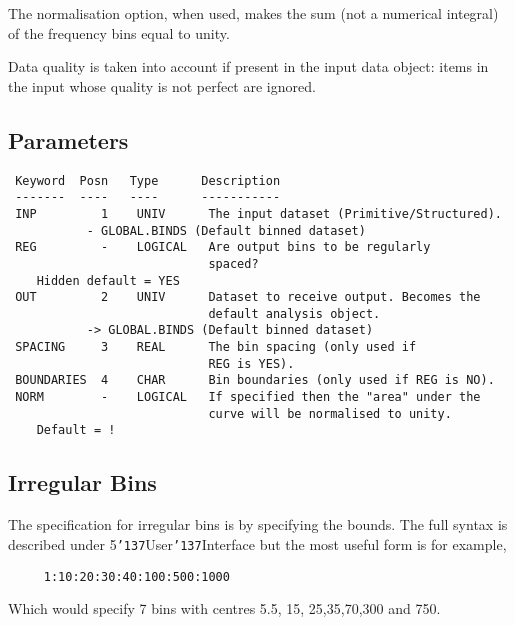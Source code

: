 \documentclass{book}
\renewcommand{\_}{{\tt\char'137}}     %
\begin{document}
The normalisation option, when used, makes the sum (not a
numerical integral) of the frequency bins equal to unity.

Data quality is taken into account if present in the input data
object: items in the input whose quality is not perfect are
ignored.

\subsection{Parameters}
\begin{verbatim}
 Keyword  Posn   Type      Description
 -------  ----   ----      -----------
 INP         1    UNIV      The input dataset (Primitive/Structured).
           - GLOBAL.BINDS (Default binned dataset)
 REG         -    LOGICAL   Are output bins to be regularly
                            spaced?
    Hidden default = YES
 OUT         2    UNIV      Dataset to receive output. Becomes the
                            default analysis object.
           -> GLOBAL.BINDS (Default binned dataset)
 SPACING     3    REAL      The bin spacing (only used if
                            REG is YES).
 BOUNDARIES  4    CHAR      Bin boundaries (only used if REG is NO).
 NORM        -    LOGICAL   If specified then the "area" under the
                            curve will be normalised to unity.
    Default = !

\end{verbatim}\subsection{Irregular Bins}
The specification for irregular bins is by specifying the
bounds. The full syntax is described under 5\_User\_Interface
but the most useful form is for example,
\begin{verbatim}
     1:10:20:30:40:100:500:1000
\end{verbatim}
Which would specify 7 bins with centres 5.5, 15, 25,35,70,300 and 750.
\end{document}
